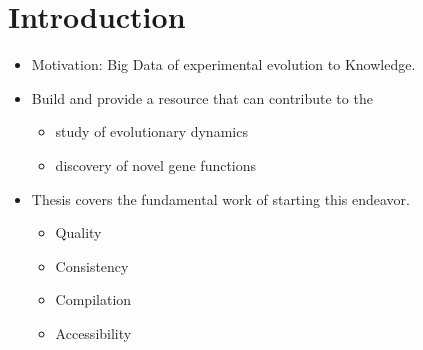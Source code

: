 \documentclass[12pt,final,masters,chapterheads]{ucsd}  %
\begin{document}
%





%   
%   
%
\chapter{Introduction}

%
%

%
%

%
%
%
%


\begin{itemize}
\item Motivation: Big Data of experimental evolution to Knowledge.
\item Build and provide a resource that can contribute to the
\begin{itemize}
\item study of evolutionary dynamics
\item discovery of novel gene functions
\end{itemize}
\item Thesis covers the fundamental work of starting this endeavor.
\begin{itemize}
\item Quality
\item Consistency
\item Compilation
\item Accessibility
\end{itemize}

\end{itemize}
\end{document}
